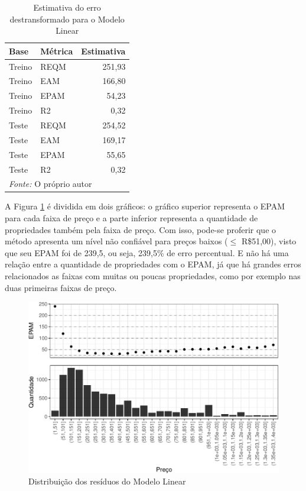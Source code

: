 \documentclass[
	12pt,				%
	a4paper,		%
	oneside,    %
	chapter=TITLE,		   %
	section=TITLE,		   %
	subsection=TITLE,	   %
	subsubsection=TITLE, %
	english,			%
	french,				%
	spanish,			%
	brazil,				%
]{abntex2}
\begin{document}
\begin{table}

\caption{\label{tab:lm_metricas}Estimativa do erro destransformado para o Modelo Linear}
\centering
\begin{tabular}[t]{l|l|r}
\hline
Base & Métrica & Estimativa\\
\hline
Treino & REQM & 251,93\\
\hline
Treino & EAM & 166,80\\
\hline
Treino & EPAM & 54,23\\
\hline
Treino & R2 & 0,32\\
\hline
Teste & REQM & 254,52\\
\hline
Teste & EAM & 169,17\\
\hline
Teste & EPAM & 55,65\\
\hline
Teste & R2 & 0,32\\
\hline
\multicolumn{3}{l}{\textit{Fonte: } O próprio autor}\\
\end{tabular}
\end{table}

A Figura \ref{graf_resid_ml} é dividida em dois gráficos: o gráfico
superior representa o EPAM para cada faixa de preço e a parte inferior
representa a quantidade de propriedades também pela faixa de preço. Com
isso, pode-se proferir que o método apresenta um nível não confiável
para preços baixos (\(\leq\) R\$51,00), visto que seu EPAM foi de 239,5,
ou seja, 239,5\% de erro percentual. E não há uma relação entre a
quantidade de propriedades com o EPAM, já que há grandes erros
relacionados as faixas com muitas ou poucas propriedades, como por
exemplo nas duas primeiras faixas de preço.

\begin{figure}
\centering
\includegraphics{00-TCC_files/figure-latex/graf_resid_ml-1.pdf}
\caption{\label{graf_resid_ml}Distribuição dos resíduos do Modelo
Linear}
\end{figure}
\end{document}
